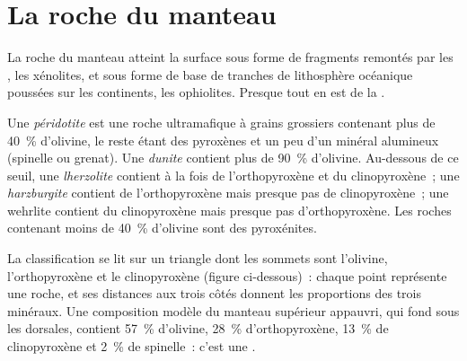 \section{La roche du manteau}\label{sec:b2:mantle-melting:rock}

La roche du manteau atteint la surface sous forme de fragments remontés par les ,
les xénolites, et sous forme de base de tranches de lithosphère océanique poussées sur
les continents, les ophiolites. Presque tout en est de la .

\begin{definition}\label{def:b2:mantle-melting:peridotites}
Une \emph{péridotite} est une roche ultramafique à grains grossiers
contenant plus de \qty{40}{\percent} d'olivine, le reste étant des pyroxènes et un peu
d'un minéral alumineux (spinelle ou grenat). Une
\emph{dunite} contient plus de \qty{90}{\percent} d'olivine. Au-dessous de
ce seuil, une \emph{lherzolite} contient à la fois de l'orthopyroxène et
du clinopyroxène~; une \emph{harzburgite} contient de l'orthopyroxène mais
presque pas de clinopyroxène~; une wehrlite contient du clinopyroxène mais presque pas
d'orthopyroxène. Les roches contenant moins de \qty{40}{\percent} d'olivine sont des pyroxénites.
\end{definition}

La classification se lit sur un triangle dont les sommets sont l'olivine,
l'orthopyroxène et le clinopyroxène (figure ci-dessous)~: chaque point représente une roche,
et ses distances aux trois côtés donnent les proportions des trois
minéraux. Une composition modèle du manteau supérieur appauvri, qui fond sous
les dorsales, contient \qty{57}{\percent} d'olivine,
\qty{28}{\percent} d'orthopyroxène, \qty{13}{\percent} de clinopyroxène et
\qty{2}{\percent} de spinelle~: c'est une .

